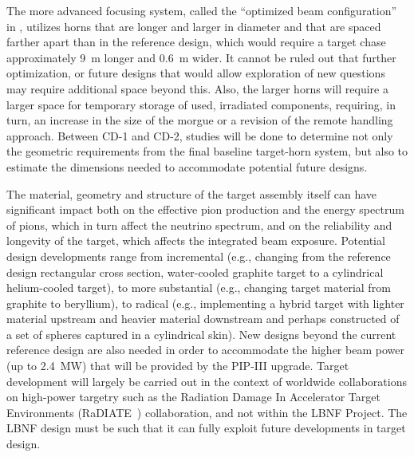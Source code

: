 The more advanced focusing system, called the ``optimized beam configuration'' in %
, utilizes horns that are longer and larger in diameter and that are spaced farther apart than in the reference design, which would require a target chase approximately 9~m longer and 0.6~m wider.  %
It cannot be ruled out that further optimization, or future designs that would
allow exploration of new questions may require additional space beyond this.  Also, the larger horns will require a larger 
space for temporary storage of used, irradiated components, requiring, in turn, an increase in the size of the morgue or a revision of the remote handling approach.  Between CD-1 and CD-2, studies will be done to determine not only the geometric 
requirements from the final baseline target-horn system, but also to estimate the dimensions needed to accommodate potential future designs.
 
The material, geometry and structure of the target assembly itself can have significant impact both on the effective pion production and the energy spectrum of pions, which in turn affect the neutrino spectrum, and on the reliability and longevity of 
the target, which affects the integrated beam exposure.  Potential design developments range from incremental (e.g., changing from the reference design rectangular cross section, water-cooled graphite target to a cylindrical 
helium-cooled target), to more substantial (e.g., changing target material from graphite to beryllium), to radical (e.g., implementing a hybrid target with lighter material upstream and heavier material downstream and perhaps constructed of a set of spheres captured in a 
cylindrical skin).  New designs beyond the current reference design are also needed in order to accommodate the higher beam power (up to 2.4~MW) that will be provided by the PIP-III upgrade.  
Target development will largely be carried out in the 
context of worldwide collaborations on high-power targetry such as the Radiation Damage In Accelerator Target 
Environments (RaDIATE~\cite{radiate-web}) collaboration, and not within the LBNF Project. The LBNF design must be such that it can fully exploit future developments in target design.
 
